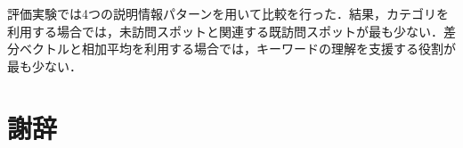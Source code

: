 \documentclass{deimj}
\begin{document}
評価実験では4つの説明情報パターンを用いて比較を行った．結果，カテゴリを利用する場合では，未訪問スポットと関連する既訪問スポットが最も少ない．差分ベクトルと相加平均を利用する場合では，キーワードの理解を支援する役割が最も少ない．



\section*{謝辞}
\end{document}
